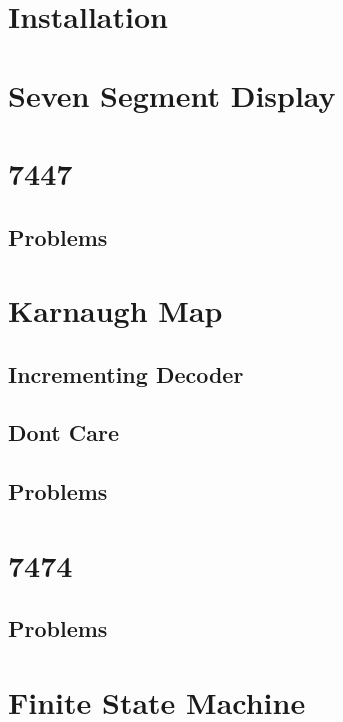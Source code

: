 \documentclass[journal]{IEEEtran}
\begin{document}
\newpage
\onecolumn

\section{Installation}

\newpage
\section{Seven Segment Display}

\newpage
\section{7447}

\subsection{Problems}

\newpage
\section{Karnaugh Map}
\subsection{ Incrementing Decoder}

\subsection{Dont Care}

\subsection{Problems}

\newpage
\section{7474}

\subsection{Problems}

\newpage
\section{Finite State Machine}

\end{document}
